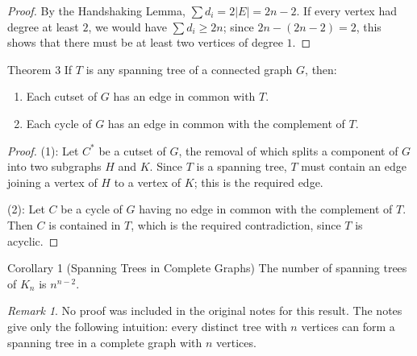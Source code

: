 \documentclass[11pt]{scrartcl}
\theoremstyle{plain}
\theoremstyle{remark}
\newtheorem*{remark}{Remark}
\begin{document}
\begin{proof}
By the Handshaking Lemma, $\sum d_i = 2|E| = 2n - 2$. If every vertex had degree at least $2$, we would have $\sum d_i \geq 2n$; since $2n - (2n-2) = 2$, this shows that there must be at least two vertices of degree $1$.
\end{proof}

\begin{thmbox}{Theorem 3}
If $T$ is any spanning tree of a connected graph $G$, then:
\begin{enumerate}
  \item Each cutset of $G$ has an edge in common with $T$.
  \item Each cycle of $G$ has an edge in common with the complement of $T$.
\end{enumerate}
\end{thmbox}

\begin{proof}
(1): Let $C^*$ be a cutset of $G$, the removal of which splits a component of $G$ into two subgraphs $H$ and $K$. Since $T$ is a spanning tree, $T$ must contain an edge joining a vertex of $H$ to a vertex of $K$; this is the required edge.

\smallskip
\noindent (2): Let $C$ be a cycle of $G$ having no edge in common with the complement of $T$. Then $C$ is contained in $T$, which is the required contradiction, since $T$ is acyclic.
\end{proof}

\begin{thmbox}{Corollary 1 (Spanning Trees in Complete Graphs)}
The number of spanning trees of $K_n$ is $n^{n-2}$.
\end{thmbox}

\begin{remark}
No proof was included in the original notes for this result. The notes give only the following intuition: every distinct tree with $n$ vertices can form a spanning tree in a complete graph with $n$ vertices.
\end{remark}
\end{document}
